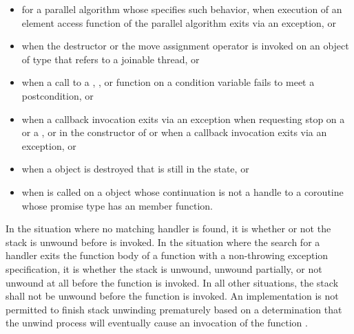 \begin{note}
\begin{itemize}
\item%
for a parallel algorithm whose  specifies such
behavior,
when execution of an element access function
of the parallel algorithm exits via an exception, or

\item%
when the destructor or the move assignment operator is invoked on an object
of type  that refers to
a joinable thread, or

\item%
when a call to a , , or 
function on a condition variable
fails to meet a postcondition, or

\item%
when a callback invocation exits via an exception
when requesting stop on
a  or
a ,
or in the constructor of
 or
when a callback invocation exits via an exception, or

\item%
when a  object is destroyed
that is still in the  state, or

\item%
when  is called on
a  object
whose continuation is not a handle to a coroutine
whose promise type has an  member function.

\end{itemize}

\end{note}

\pnum
{}%
In the situation where no matching handler is found, it is
whether or not the stack is unwound
before  is invoked.
In the situation where the search for a handler
exits the function body of a function
with a non-throwing exception specification, it is
whether the stack is unwound, unwound partially, or not unwound at all
before the function  is invoked.
In all other situations, the stack shall not be unwound before
the function 
is invoked.
An implementation is not permitted to finish stack unwinding
prematurely based on a determination that the unwind process
will eventually cause an invocation of the function
.
